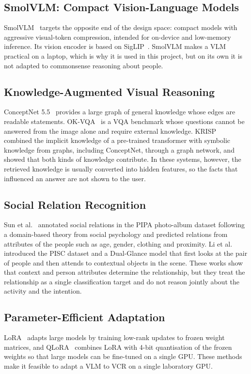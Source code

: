 \subsection{SmolVLM: Compact Vision-Language Models}
SmolVLM~\cite{marafioti2025smolvlm} targets the opposite end of the design space: compact models with aggressive visual-token compression, intended for on-device and low-memory inference. Its vision encoder is based on SigLIP~\cite{zhai2023siglip}. SmolVLM makes a VLM practical on a laptop, which is why it is used in this project, but on its own it is not adapted to commonsense reasoning about people.

\subsection{Knowledge-Augmented Visual Reasoning}
ConceptNet 5.5~\cite{speer2017conceptnet} provides a large graph of general knowledge whose edges are readable statements. OK-VQA~\cite{marino2019okvqa} is a VQA benchmark whose questions cannot be answered from the image alone and require external knowledge. KRISP~\cite{marino2021krisp} combined the implicit knowledge of a pre-trained transformer with symbolic knowledge from graphs, including ConceptNet, through a graph network, and showed that both kinds of knowledge contribute. In these systems, however, the retrieved knowledge is usually converted into hidden features, so the facts that influenced an answer are not shown to the user.

\subsection{Social Relation Recognition}
Sun et al.~\cite{sun2017domain} annotated social relations in the PIPA photo-album dataset following a domain-based theory from social psychology and predicted relations from attributes of the people such as age, gender, clothing and proximity. Li et al.~\cite{li2017dualglance} introduced the PISC dataset and a Dual-Glance model that first looks at the pair of people and then attends to contextual objects in the scene. These works show that context and person attributes determine the relationship, but they treat the relationship as a single classification target and do not reason jointly about the activity and the intention.

\subsection{Parameter-Efficient Adaptation}
LoRA~\cite{hu2022lora} adapts large models by training low-rank updates to frozen weight matrices, and QLoRA~\cite{dettmers2023qlora} combines LoRA with 4-bit quantisation of the frozen weights so that large models can be fine-tuned on a single GPU. These methods make it feasible to adapt a VLM to VCR on a single laboratory GPU.

